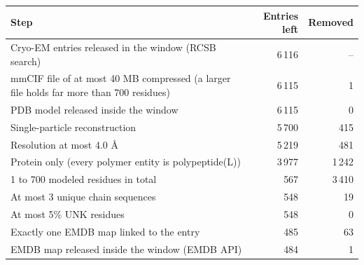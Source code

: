 \begin{tabular}{lrr}
\toprule
Step & Entries left & Removed \\
\midrule
Cryo-EM entries released in the window (RCSB search) & 6\,116 & -- \\
mmCIF file of at most 40 MB compressed (a larger file holds far more than 700 residues) & 6\,115 & 1 \\
PDB model released inside the window & 6\,115 & 0 \\
Single-particle reconstruction & 5\,700 & 415 \\
Resolution at most 4.0 \AA{} & 5\,219 & 481 \\
Protein only (every polymer entity is polypeptide(L)) & 3\,977 & 1\,242 \\
1 to 700 modeled residues in total & 567 & 3\,410 \\
At most 3 unique chain sequences & 548 & 19 \\
At most 5\% UNK residues & 548 & 0 \\
Exactly one EMDB map linked to the entry & 485 & 63 \\
EMDB map released inside the window (EMDB API) & 484 & 1 \\
\bottomrule
\end{tabular}
